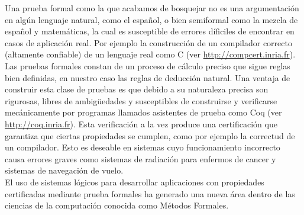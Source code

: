 \documentclass[11pt,letterpaper]{article}
\begin{document}
Una prueba formal como la que acabamos de bosquejar no es una argumentación en 
algún lenguaje natural, como el español, o  bien semiformal como la mezcla de 
español y  matemáticas, la cual es susceptible de errores díficiles de encontrar 
en casos de aplicación real. Por ejemplo la construcción de un compilador 
correcto (altamente confiable) de un lenguaje real como {\sc C} (ver 
\url{http://compcert.inria.fr}). Las pruebas formales constan de un proceso de 
cálculo preciso que sigue reglas bien definidas, en nuestro caso las reglas de 
deducción natural. Una ventaja de construir esta clase de pruebas es que debido 
a su naturaleza precisa son rigurosas, libres de ambigüedades y susceptibles de 
construirse y verificarse mecánicamente por programas llamados asistentes de 
prueba como {\sc Coq} (ver \url{http://coq.inria.fr}). Esta verificación a la 
vez produce una certificación que garantiza que ciertas propiedades se cumplen, 
como por ejemplo la correctud de un compilador. Esto es deseable en sistemas 
cuyo funcionamiento incorrecto causa errores graves como sistemas de radiación 
para enfermos de cancer y sistemas de navegación de vuelo. \\
El uso de sistemas lógicos para desarrollar aplicaciones con propiedades 
certificadas mediante prueba formales ha generado una nueva área dentro de las 
ciencias de la computación conocida como Métodos Formales.
\end{document}
